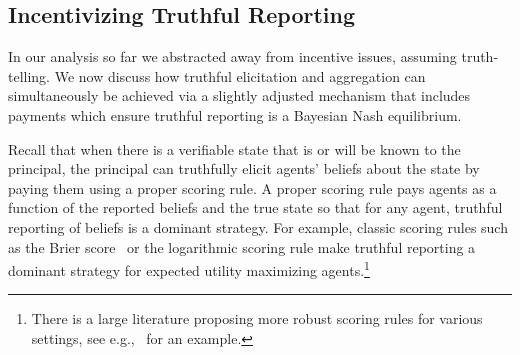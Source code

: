 \documentclass[12pt,reqno]{amsart}
\begin{document}
\subsection{Incentivizing Truthful Reporting}\label{sec:IC}
In our analysis so far we abstracted away from incentive issues, assuming truth-telling. We now discuss how truthful elicitation and aggregation can simultaneously be achieved via a slightly adjusted mechanism that includes payments which ensure truthful reporting is a  Bayesian Nash equilibrium. 

Recall that when there is a verifiable state that is or will be known to the principal, the principal can truthfully elicit agents' beliefs about the state by paying them using a proper scoring rule. A proper scoring rule pays agents as a function of the reported beliefs and the true state so that for any agent, truthful reporting of beliefs is a dominant strategy. For example, classic scoring rules such as the Brier score~\citep{brier1950verification} or the logarithmic scoring rule make truthful reporting a dominant strategy for expected utility maximizing agents.\footnote{There is a large literature proposing more robust scoring rules for various settings, see e.g.,~\cite{karni2009mechanism} for an example.}
\end{document}
